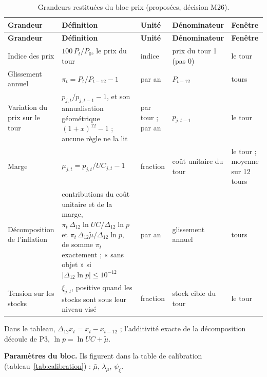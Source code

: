 \documentclass[11pt,a4paper]{article}
\begin{document}
\begin{center}\small
\setlength{\tabcolsep}{4pt}
\begin{longtable}{>{\raggedright\arraybackslash}p{2.3cm}>{\raggedright\arraybackslash}p{5.3cm}>{\raggedright\arraybackslash}p{1.6cm}>{\raggedright\arraybackslash}p{2.6cm}>{\raggedright\arraybackslash}p{2.8cm}}
\caption{Grandeurs restituées du bloc prix (proposées, décision M26).}\label{tab:prix-restitution}\\
\toprule
\textbf{Grandeur} & \textbf{Définition} & \textbf{Unité} & \textbf{Dénominateur} & \textbf{Fenêtre}\\
\midrule
\endfirsthead
\toprule
\textbf{Grandeur} & \textbf{Définition} & \textbf{Unité} & \textbf{Dénominateur} & \textbf{Fenêtre}\\
\midrule
\endhead
Indice des prix & $100\,P_t/P_0$, le prix du tour & indice & prix du tour 1 (pas 0) & le tour\\
Glissement annuel & $\pi_t = P_t/P_{t-12} - 1$ & par an & $P_{t-12}$ & 12 tours\\
Variation du prix sur le tour & $p_{j,t}/p_{j,t-1} - 1$, et son annualisation géométrique $(1 + x)^{12} - 1$ ; aucune règle ne la lit & par tour ; par an & $p_{j,t-1}$ & le tour\\
Marge & $\mu_{j,t} = p_{j,t}/\mathit{UC}_{j,t} - 1$ & fraction & coût unitaire du tour & le tour ; moyenne sur 12 tours\\
Décomposition de l'inflation & contributions du coût unitaire et de la marge, $\pi_t\,\Delta_{12}\ln\mathit{UC}/\Delta_{12}\ln p$ et $\pi_t\,\Delta_{12}\tilde\mu/\Delta_{12}\ln p$, de somme $\pi_t$ exactement ; « sans objet » si $|\Delta_{12}\ln p| \le 10^{-12}$ & par an & glissement annuel & 12 tours\\
Tension sur les stocks & $\xi_{j,t}$, positive quand les stocks sont sous leur niveau visé & fraction & stock cible du tour & le tour\\
\bottomrule
\end{longtable}
\end{center}
Dans le tableau, $\Delta_{12}x_t = x_t - x_{t-12}$ ; l'additivité exacte de la décomposition découle de P3, $\ln p = \ln\mathit{UC} + \tilde\mu$.

\textbf{Paramètres du bloc.} Ils figurent dans la table de calibration (tableau~\ref{tab:calibration}) : $\bar\mu$, $\lambda_\mu$, $\psi_\xi$.
\end{document}
